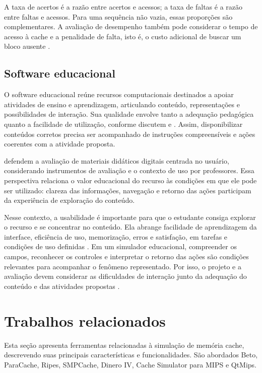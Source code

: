 \documentclass[article,12pt,oneside,a4paper,english,brazil]{abntex2}
\begin{document}
A taxa de acertos é a razão entre acertos e acessos; a taxa de faltas é a razão entre faltas e acessos. Para uma sequência não vazia, essas proporções são complementares. A avaliação de desempenho também pode considerar o tempo de acesso à cache e a penalidade de falta, isto é, o custo adicional de buscar um bloco ausente \cite{sonia2021cache,barbhuiya2024cache}.

\subsection{Software educacional}
\label{sec:software-educacional}

O software educacional reúne recursos computacionais destinados a apoiar atividades de ensino e aprendizagem, articulando conteúdo, representações e possibilidades de interação. Sua qualidade envolve tanto a adequação pedagógica quanto a facilidade de utilização, conforme discutem  e . Assim, disponibilizar conteúdos corretos precisa ser acompanhado de instruções compreensíveis e ações coerentes com a atividade proposta.

 defendem a avaliação de materiais didáticos digitais centrada no usuário, considerando instrumentos de avaliação e o contexto de uso por professores. Essa perspectiva relaciona o valor educacional do recurso às condições em que ele pode ser utilizado: clareza das informações, navegação e retorno das ações participam da experiência de exploração do conteúdo.

Nesse contexto, a usabilidade é importante para que o estudante consiga explorar o recurso e se concentrar no conteúdo. Ela abrange facilidade de aprendizagem da interface, eficiência de uso, memorização, erros e satisfação, em tarefas e condições de uso definidas \cite{nielsen1993usability}. Em um simulador educacional, compreender os campos, reconhecer os controles e interpretar o retorno das ações são condições relevantes para acompanhar o fenômeno representado. Por isso, o projeto e a avaliação devem considerar as dificuldades de interação junto da adequação do conteúdo e das atividades propostas \cite{barbosa2010ihc,godoi2009avaliacao}.

\section{Trabalhos relacionados}
\label{sec:relacionados}

Esta seção apresenta ferramentas relacionadas à simulação de memória cache, descrevendo suas principais características e funcionalidades. São abordados Beto, ParaCache, Ripes, SMPCache, Dinero IV, Cache Simulator para MIPS e QtMips.
\end{document}
